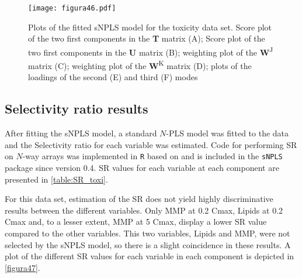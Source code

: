 \begin{figure}[hbtp]
	\centering
\texttt{[image: figura46.pdf]}
\caption[Plots of the fitted sNPLS model for the toxicity data set]{Plots of the fitted sNPLS model for the toxicity data set. Score plot of the two first components in the \textbf{T} matrix (A); Score plot of the two first components in the \textbf{U} matrix (B); weighting plot of the \textbf{W}\textsuperscript{J} matrix (C); weighting plot of the \textbf{W}\textsuperscript{K} matrix (D); plots of the loadings of the second (E) and third (F) modes}
\label{figura46}
\end{figure}

\subsection{Selectivity ratio results}
After fitting the sNPLS model, a standard $N$-PLS model was fitted to the data and the Selectivity ratio for each variable was estimated. Code for performing SR on $N$-way arrays was implemented in \texttt{R} based on \textcite{rajalahti2009biomarker} and is included in the \texttt{sNPLS} package since version 0.4. SR values for each variable at each component are presented in \autoref{table:SR_toxi}.

For this data set, estimation of the SR does not yield highly discriminative results between the different variables. Only MMP at 0.2 Cmax, Lipids at 0.2 Cmax and, to a lesser extent, MMP at 5 Cmax, display a lower SR value compared to the other variables. This two variables, Lipids and MMP, were not selected by the sNPLS model, so there is a slight coincidence in these results. A plot of the different SR values for each variable in each component is depicted in \autoref{figura47}.
\vspace{10pt}


